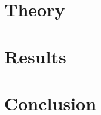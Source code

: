 \documentclass[12pt, oneside]{book}
\begin{document}

\chapter{Theory}
\label{chap:theo}



\chapter{Results}
\label{chap:res}



\chapter{Conclusion}
\label{chap:con}


% 








\appendix
\renewcommand{\thesection}{A\arabic{section}}

\end{document}
